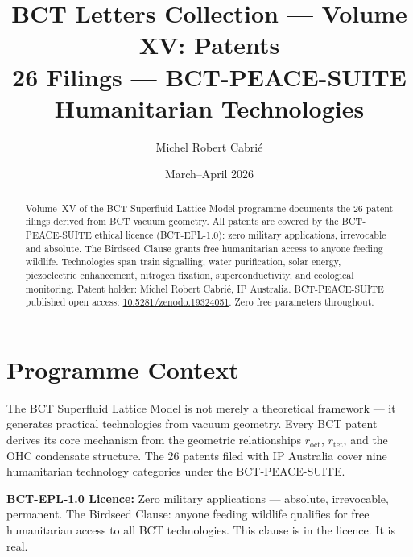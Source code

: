 \documentclass[aps,prl,twocolumn,showpacs,preprintnumbers]{revtex4-2}
\newcommand{\roct}{r_{\mathrm{oct}}}
\newcommand{\rtet}{r_{\mathrm{tet}}}
\begin{document}

\title{BCT Letters Collection --- Volume XV: Patents\\
\large 26 Filings --- BCT-PEACE-SUITE Humanitarian Technologies}

\author{Michel Robert Cabri\'e}

\date{March--April 2026}

\begin{abstract}
Volume~XV of the BCT Superfluid Lattice Model programme documents the
26 patent filings derived from BCT vacuum geometry. All patents are
covered by the BCT-PEACE-SUITE ethical licence (BCT-EPL-1.0):
zero military applications, irrevocable and absolute. The Birdseed
Clause grants free humanitarian access to anyone feeding wildlife.
Technologies span train signalling, water purification, solar energy,
piezoelectric enhancement, nitrogen fixation, superconductivity, and
ecological monitoring. Patent holder: Michel Robert Cabrié, IP Australia.
BCT-PEACE-SUITE published open access:
\href{https://doi.org/10.5281/zenodo.19324051}{10.5281/zenodo.19324051}.
Zero free parameters throughout.
\end{abstract}

\maketitle

\section*{Programme Context}

The BCT Superfluid Lattice Model is not merely a theoretical framework
--- it generates practical technologies from vacuum geometry. Every BCT
patent derives its core mechanism from the geometric relationships
$\roct$, $\rtet$, and the OHC condensate structure. The 26 patents
filed with IP Australia cover nine humanitarian technology categories
under the BCT-PEACE-SUITE.

\medskip
\noindent\textbf{BCT-EPL-1.0 Licence:} Zero military applications ---
absolute, irrevocable, permanent. The Birdseed Clause: anyone feeding
wildlife qualifies for free humanitarian access to all BCT technologies.
This clause is in the licence. It is real.
\end{document}
